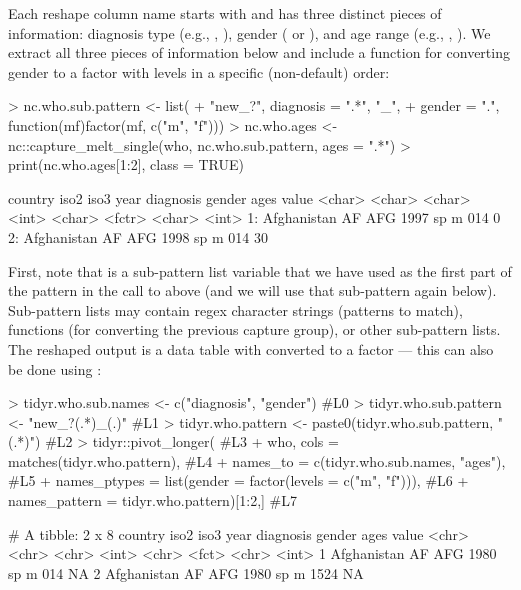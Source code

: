 Each reshape column name starts with  and has three distinct
pieces of information: diagnosis type (e.g., , ),
gender ( or ), and age range (e.g., ,
). We extract all three pieces of information below
and include a function for converting gender to a factor with levels
in a specific (non-default) order:

\begin{Schunk}
\begin{Sinput}
> nc.who.sub.pattern <- list(
+   "new_?", diagnosis = ".*", "_",
+   gender = ".", function(mf)factor(mf, c("m", "f")))
> nc.who.ages <- nc::capture_melt_single(who, nc.who.sub.pattern, ages = ".*")
> print(nc.who.ages[1:2], class = TRUE)
\end{Sinput}
\begin{Soutput}
       country   iso2   iso3  year diagnosis gender   ages value
        <char> <char> <char> <int>    <char> <fctr> <char> <int>
1: Afghanistan     AF    AFG  1997        sp      m    014     0
2: Afghanistan     AF    AFG  1998        sp      m    014    30
\end{Soutput}
\end{Schunk}

First, note that  is a sub-pattern list variable that we
have used as the first part of the pattern in the call to
 above (and we will use that
sub-pattern again below). Sub-pattern lists may contain regex
character strings (patterns to match), functions (for
converting the previous capture group), or other sub-pattern lists. The
reshaped output is a data table with  converted to a factor ---
this can also be done using :

\begin{Schunk}
\begin{Sinput}
> tidyr.who.sub.names <- c("diagnosis", "gender")               #L0
> tidyr.who.sub.pattern <- "new_?(.*)_(.)"                      #L1
> tidyr.who.pattern <- paste0(tidyr.who.sub.pattern, "(.*)")    #L2
> tidyr::pivot_longer(                                          #L3
+   who, cols = matches(tidyr.who.pattern),                     #L4
+   names_to = c(tidyr.who.sub.names, "ages"),                  #L5
+   names_ptypes = list(gender = factor(levels = c("m", "f"))), #L6
+   names_pattern = tidyr.who.pattern)[1:2,]                    #L7
\end{Sinput}
\begin{Soutput}
# A tibble: 2 x 8
  country     iso2  iso3   year diagnosis gender ages  value
  <chr>       <chr> <chr> <int> <chr>     <fct>  <chr> <int>
1 Afghanistan AF    AFG    1980 sp        m      014      NA
2 Afghanistan AF    AFG    1980 sp        m      1524     NA
\end{Soutput}
\end{Schunk}

